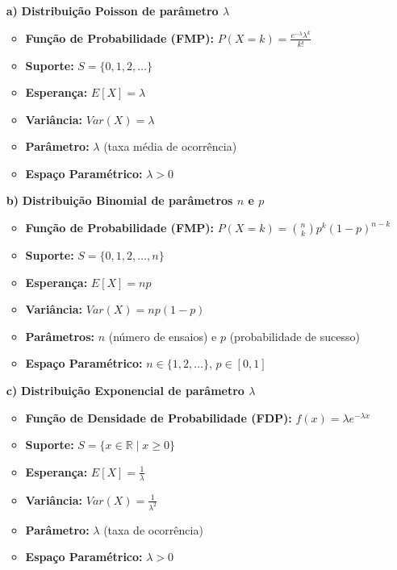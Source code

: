 \documentclass[12pt, a4paper]{article}
\begin{document}
\begin{enumerate}
    \item[\textbf{a)}] \textbf{Distribuição Poisson de parâmetro $\lambda$}
        \begin{itemize}
            \item \textbf{Função de Probabilidade (FMP):} $P(X=k) = \frac{e^{-\lambda}\lambda^k}{k!}$
            \item \textbf{Suporte:} $S = \{0, 1, 2, \dots\}$
            \item \textbf{Esperança:} $E[X] = \lambda$
            \item \textbf{Variância:} $Var(X) = \lambda$
            \item \textbf{Parâmetro:} $\lambda$ (taxa média de ocorrência)
            \item \textbf{Espaço Paramétrico:} $\lambda > 0$
        \end{itemize}

    \item[\textbf{b)}] \textbf{Distribuição Binomial de parâmetros $n$ e $p$}
        \begin{itemize}
            \item \textbf{Função de Probabilidade (FMP):} $P(X=k) = \binom{n}{k} p^k (1-p)^{n-k}$
            \item \textbf{Suporte:} $S = \{0, 1, 2, \dots, n\}$
            \item \textbf{Esperança:} $E[X] = np$
            \item \textbf{Variância:} $Var(X) = np(1-p)$
            \item \textbf{Parâmetros:} $n$ (número de ensaios) e $p$ (probabilidade de sucesso)
            \item \textbf{Espaço Paramétrico:} $n \in \{1, 2, \dots\}$, $p \in [0, 1]$
        \end{itemize}

    \item[\textbf{c)}] \textbf{Distribuição Exponencial de parâmetro $\lambda$}
        \begin{itemize}
            \item \textbf{Função de Densidade de Probabilidade (FDP):} $f(x) = \lambda e^{-\lambda x}$
            \item \textbf{Suporte:} $S = \{x \in \mathbb{R} \mid x \ge 0\}$
            \item \textbf{Esperança:} $E[X] = \frac{1}{\lambda}$
            \item \textbf{Variância:} $Var(X) = \frac{1}{\lambda^2}$
            \item \textbf{Parâmetro:} $\lambda$ (taxa de ocorrência)
            \item \textbf{Espaço Paramétrico:} $\lambda > 0$
        \end{itemize}


\end{enumerate}
\end{document}
